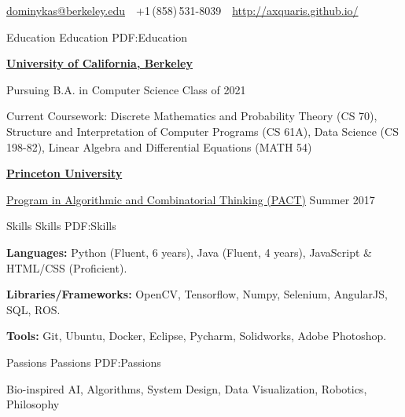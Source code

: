 \documentclass[letterpaper,MMMyyyy,nonstopmode]{simpleresumecv}
\newcommand{\CVAuthor}{Domas Buracas}
\newcommand{\CVWebpage}{http://axquaris.github.io/}
\begin{document}

\Title{\CVAuthor}

\begin{SubTitle}
\par
\href{mailto:dominykas@berkeley.edu}
{dominykas@berkeley.edu}
\,\SubBulletSymbol\,
+1\,(858)\,531-8039
\,\SubBulletSymbol\,
\href{\CVWebpage}
{\url{\CVWebpage}}
\end{SubTitle}

\begin{Body}


\Section
{Education}
{Education}
{PDF:Education}

\Entry
\href{http://www.berkeley.edu/}
{\textbf{University of California, Berkeley}}

\Gap
\BulletItem
Pursuing B.A. in Computer Science
\hfill
Class of 2021
\begin{Detail}
\SubBulletItem
Current Coursework: Discrete Mathematics and Probability Theory (CS 70),
Structure and Interpretation of Computer Programs (CS 61A),
Data Science (CS 198-82), Linear Algebra and Differential Equations (MATH 54)
\end{Detail}

\BigGap
\Entry
\href{https://www.princeton.edu/}
{\textbf{Princeton University}}

\Gap
\BulletItem
\href{https://algorithmicthinking.org/}
{Program in Algorithmic and Combinatorial Thinking (PACT)}
\hfill
Summer 2017


\Section
{Skills}
{Skills}
{PDF:Skills}

\Entry
\textbf{Languages:}
Python (Fluent, 6 years),
Java (Fluent, 4 years),
JavaScript \& HTML/CSS (Proficient).

\Gap
\Entry
\textbf{Libraries/Frameworks:}
OpenCV,
Tensorflow,
Numpy,
Selenium,
AngularJS,
SQL,
ROS.

\Gap
\Entry
\textbf{Tools:}
Git,
Ubuntu,
Docker,
Eclipse,
Pycharm,
Solidworks,
Adobe Photoshop.



\Section
{Passions}
{Passions}
{PDF:Passions}

\Entry
Bio-inspired AI, Algorithms, System Design, Data Visualization, Robotics, Philosophy


\end{Body}
\end{document}
